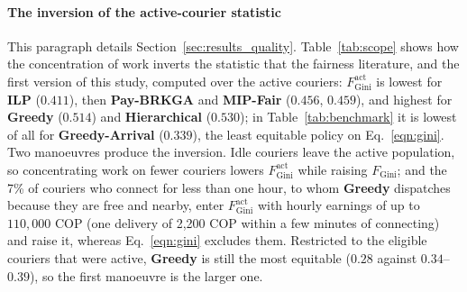 \documentclass[a4paper,11pt,review,3p,authoryear]{elsarticle}
\newcommand{\FG}{F_{\text{Gini}}}
\newcommand{\FGa}{F_{\text{Gini}}^{\text{act}}}
\begin{document}
\paragraph{The inversion of the active-courier statistic} This paragraph details Section~\ref{sec:results_quality}. Table~\ref{tab:scope} shows how the concentration of work inverts the statistic that the fairness literature, and the first version of this study, computed over the active couriers: $\FGa$ is lowest for \textbf{ILP} ($0.411$), then \textbf{Pay-BRKGA} and \textbf{MIP-Fair} ($0.456$, $0.459$), and highest for \textbf{Greedy} ($0.514$) and \textbf{Hierarchical} ($0.530$); in Table~\ref{tab:benchmark} it is lowest of all for \textbf{Greedy-Arrival} ($0.339$), the least equitable policy on Eq.~\eqref{eqn:gini}. Two manoeuvres produce the inversion. Idle couriers leave the active population, so concentrating work on fewer couriers lowers $\FGa$ while raising $\FG$; and the 7\% of couriers who connect for less than one hour, to whom \textbf{Greedy} dispatches because they are free and nearby, enter $\FGa$ with hourly earnings of up to $110{,}000$ COP (one delivery of 2{,}200 COP within a few minutes of connecting) and raise it, whereas Eq.~\eqref{eqn:gini} excludes them. Restricted to the eligible couriers that were active, \textbf{Greedy} is still the most equitable ($0.28$ against $0.34$--$0.39$), so the first manoeuvre is the larger one.
\end{document}
